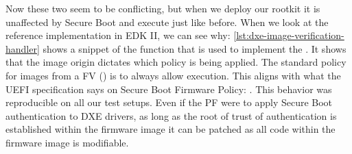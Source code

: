 Now these two seem to be conflicting, but when we deploy our rootkit it is unaffected by Secure Boot and execute just like before.
When we look at the reference implementation in \ac{EDK} II, we can see why: \autoref{lst:dxe-image-verification-handler} shows a snippet of the function that is used to implement the .
It shows that the image origin dictates which policy is being applied.
The standard policy for images from a \acf{FV} () is to always allow execution.
This aligns with what the \ac{UEFI} specification says on Secure Boot Firmware Policy:
.
This behavior was reproducible on all our test setups.
Even if the \ac{PF} were to apply Secure Boot authentication to \ac{DXE} drivers, as long as the root of trust of authentication is established within the firmware image it can be patched as all code within the firmware image is modifiable.

\vspace{1em}



\clearpage